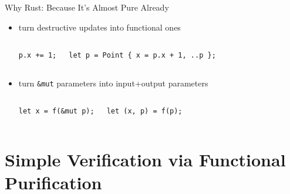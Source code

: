 \documentclass{beamer}
\begin{document}
\begin{frame}[fragile]{Why Rust: Because It's Almost Pure Already}
  \begin{itemize}
    \item turn destructive updates into functional ones
      \begin{columns}
        \color{gray}
        \begin{verbatim}
p.x += 1;
        \end{verbatim}
        \begin{verbatim}
let p = Point { x = p.x + 1, ..p };
        \end{verbatim}
      \end{columns}
    \hfill
    \item turn \texttt{&mut} parameters into input+output parameters
      \begin{columns}
        \color{gray}
        \begin{verbatim}
let x = f(&mut p);
        \end{verbatim}
        \begin{verbatim}
let (x, p) = f(p);
        \end{verbatim}
      \end{columns}
  \end{itemize}
\end{frame}

\section{Simple Verification via Functional Purification}
\end{document}
